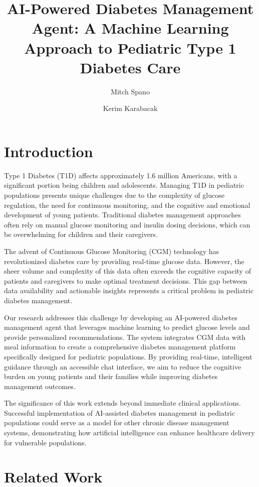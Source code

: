 \documentclass[acmsmall]{acmart}
\title{AI-Powered Diabetes Management Agent: A Machine Learning Approach to Pediatric Type 1 Diabetes Care}
\author{Mitch Spano}
\affiliation{%
  \institution{The University of Texas at Austin}
  \city{Austin}
  \state{Texas}
  \country{USA}
}
\author{Kerim Karabacak}
\affiliation{%
  \institution{The University of Texas at Austin}
  \city{Austin}
  \state{Texas}
  \country{USA}
}
\begin{document}
\maketitle

\section{Introduction}

Type 1 Diabetes (T1D) affects approximately 1.6 million Americans, with a significant portion being children and adolescents. Managing T1D in pediatric populations presents unique challenges due to the complexity of glucose regulation, the need for continuous monitoring, and the cognitive and emotional development of young patients. Traditional diabetes management approaches often rely on manual glucose monitoring and insulin dosing decisions, which can be overwhelming for children and their caregivers.

The advent of Continuous Glucose Monitoring (CGM) technology has revolutionized diabetes care by providing real-time glucose data. However, the sheer volume and complexity of this data often exceeds the cognitive capacity of patients and caregivers to make optimal treatment decisions. This gap between data availability and actionable insights represents a critical problem in pediatric diabetes management.

Our research addresses this challenge by developing an AI-powered diabetes management agent that leverages machine learning to predict glucose levels and provide personalized recommendations. The system integrates CGM data with meal information to create a comprehensive diabetes management platform specifically designed for pediatric populations. By providing real-time, intelligent guidance through an accessible chat interface, we aim to reduce the cognitive burden on young patients and their families while improving diabetes management outcomes.

The significance of this work extends beyond immediate clinical applications. Successful implementation of AI-assisted diabetes management in pediatric populations could serve as a model for other chronic disease management systems, demonstrating how artificial intelligence can enhance healthcare delivery for vulnerable populations.

\section{Related Work}
\end{document}
